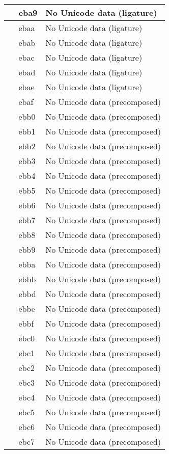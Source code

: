 \documentclass[12pt,letterpaper,openany]{book}
\begin{document}
\begin{center}
\begin{supertabular}{|m{0.25in}|m{0.5in}|m{4in}|}
 & eba9 & No Unicode data (ligature)\\\hline
 & ebaa & No Unicode data (ligature)\\\hline
 & ebab & No Unicode data (ligature)\\\hline
 & ebac & No Unicode data (ligature)\\\hline
 & ebad & No Unicode data (ligature)\\\hline
 & ebae & No Unicode data (ligature)\\\hline
 & ebaf & No Unicode data (precomposed)\\\hline
 & ebb0 & No Unicode data (precomposed)\\\hline
 & ebb1 & No Unicode data (precomposed)\\\hline
 & ebb2 & No Unicode data (precomposed)\\\hline
 & ebb3 & No Unicode data (precomposed)\\\hline
 & ebb4 & No Unicode data (precomposed)\\\hline
 & ebb5 & No Unicode data (precomposed)\\\hline
 & ebb6 & No Unicode data (precomposed)\\\hline
 & ebb7 & No Unicode data (precomposed)\\\hline
 & ebb8 & No Unicode data (precomposed)\\\hline
 & ebb9 & No Unicode data (precomposed)\\\hline
 & ebba & No Unicode data (precomposed)\\\hline
 & ebbb & No Unicode data (precomposed)\\\hline
 & ebbd & No Unicode data (precomposed)\\\hline
 & ebbe & No Unicode data (precomposed)\\\hline
 & ebbf & No Unicode data (precomposed)\\\hline
 & ebc0 & No Unicode data (precomposed)\\\hline
 & ebc1 & No Unicode data (precomposed)\\\hline
 & ebc2 & No Unicode data (precomposed)\\\hline
 & ebc3 & No Unicode data (precomposed)\\\hline
 & ebc4 & No Unicode data (precomposed)\\\hline
 & ebc5 & No Unicode data (precomposed)\\\hline
 & ebc6 & No Unicode data (precomposed)\\\hline
 & ebc7 & No Unicode data (precomposed)\\\hline

\end{supertabular}
\end{center}
\end{document}
